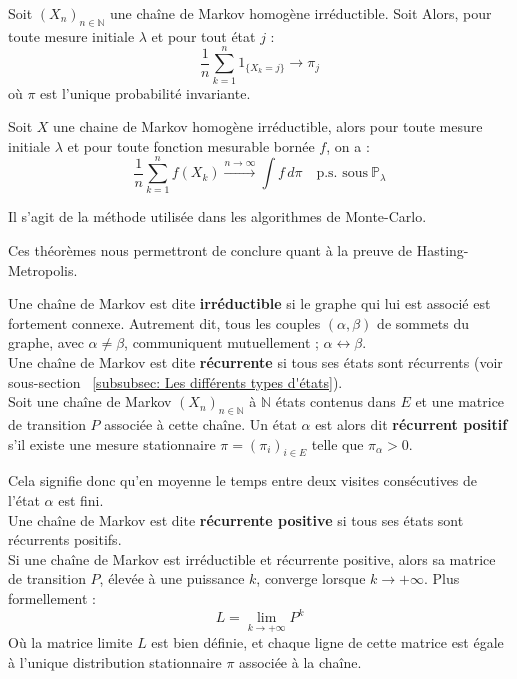 \documentclass{article}
\begin{document}
\begin{tcolorbox}[colback=white,colframe=red!80!black,title=Valeur de convergence]
Soit $(X_n)_{n \in \mathbb{N}}$ une chaîne de Markov homogène irréductible. Soit Alors, pour toute mesure initiale $\lambda$ et pour tout état $j$ :
\[
\frac{1}{n} \sum_{k=1}^{n} 1_{\{X_k = j\}} \rightarrow \pi_j
\]
où $\pi$ est l'unique probabilité invariante.
\end{tcolorbox}

\begin{tcolorbox}[colback=white,colframe=blue!80!black,title=Convergence des méthodes de Monte-Carlo]
Soit \( X \) une chaine de Markov homogène irréductible, alors pour toute mesure initiale $\lambda$ et pour toute fonction mesurable bornée $f$, on a :
\[
\frac{1}{n} \sum_{k=1}^{n} f(X_k) \xrightarrow{n \to \infty} \int f \, d\pi \quad \text{p.s. sous} \ \mathbb{P}_\lambda
\]

Il s'agit de la méthode utilisée dans les algorithmes de Monte-Carlo.
\end{tcolorbox}
  
Ces théorèmes nous permettront de conclure quant à la preuve de Hasting-Metropolis.


\begin{tcolorbox}[colback=white,colframe=yellow!80!black,title=Backup (à supprimer)]
Une chaîne de Markov est dite \textbf{irréductible} si le graphe qui lui est associé est fortement connexe. %
Autrement dit, tous les couples $(\alpha, \beta)$ de sommets du graphe, avec $\alpha \neq \beta$, communiquent mutuellement ; $\alpha \leftrightarrow \beta$. \\

Une chaîne de Markov est dite \textbf{récurrente} si tous ses états sont récurrents (voir sous-section ~\ref{subsubsec: Les différents types d'états}). \\ %

Soit une chaîne de Markov $(X_n)_{n \in \mathbb{N}}$ à $\mathbb{N}$ états contenus dans $E$ et une matrice de transition $P$ associée à cette chaîne. Un état $\alpha$ est alors dit \textbf{récurrent positif} s'il existe une mesure stationnaire $\pi = (\pi_i)_{i \in E}$ telle que $\pi_\alpha > 0$.

Cela signifie donc qu'en moyenne le temps entre deux visites consécutives de l'état $\alpha$ est fini. \\

Une chaîne de Markov est dite \textbf{récurrente positive} si tous ses états sont récurrents positifs. \\

Si une chaîne de Markov est irréductible et récurrente positive, alors sa matrice de transition $P$, élevée à une puissance $k$, converge lorsque $k \to +\infty$. Plus formellement :
\[
L = \lim_{k \to +\infty} P^k
\]
Où la matrice limite $L$ est bien définie, et chaque ligne de cette matrice est égale à l'unique distribution stationnaire $\pi$ associée à la chaîne.
\end{tcolorbox}
\end{document}
